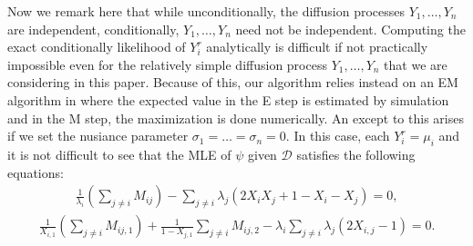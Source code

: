 \documentclass[12pt]{article}%
\begin{document}
Now we remark here that while unconditionally, the diffusion processes $Y_1,\ldots, Y_n$ are independent, 
conditionally, $Y_1,\ldots,Y_n$ need not be independent.  
Computing the exact conditionally likelihood of $Y_i^r$ analytically is difficult if not practically impossible 
even for the relatively simple diffusion process $Y_1,\ldots,Y_n$ that we are considering in this paper. 
Because of this, our algorithm relies instead on an EM algorithm in where the expected value in the E step 
is estimated by simulation and in the M step, the maximization is done numerically.     
An except to this arises if we set the nusiance parameter $\sigma_1 = \ldots = \sigma_n = 0$.
In this case, each $Y_i^r = \mu_i$ and it is not difficult to see that the MLE of $\psi$ given $\mathcal D$ 
satisfies the following equations:
\begin{eqnarray}
\frac{1}{\lambda_i} \left(\sum_{j\neq i} M_{ij}\right)  -  \sum_{j\neq i} \lambda_j (2 X_i X_j + 1 - X_i - X_j) = 0,
\end{eqnarray}
\begin{eqnarray}
\frac{1}{X_{i,1}} \left(\sum_{j\neq i} M_{ij,1}\right)  + \frac{1}{1-X_{j,1}} \sum_{j\neq i} M_{ij,2} 
-
\lambda_i \sum_{j\neq i}  \lambda_j (2 X_{i,j} - 1) =0.
\end{eqnarray}

 
\end{document}
